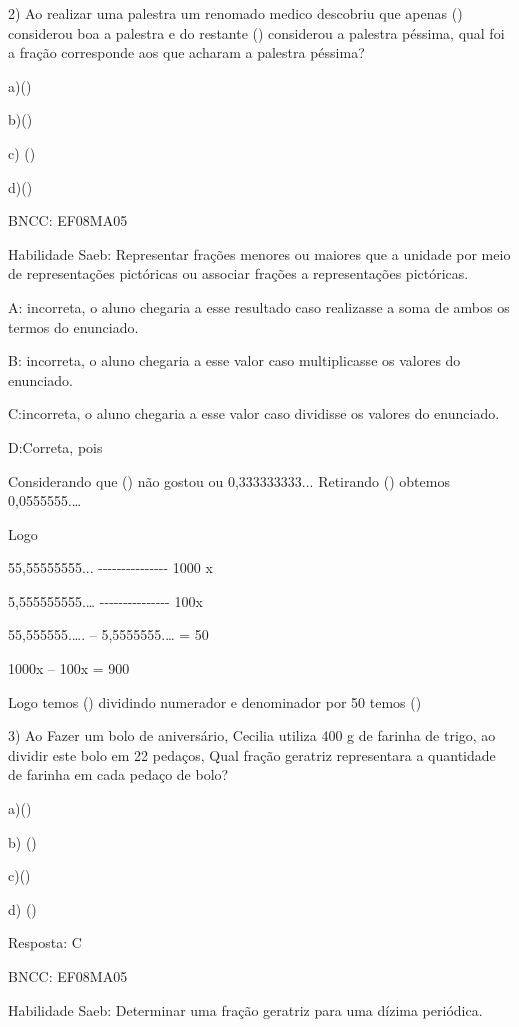 2) Ao realizar uma palestra um renomado medico descobriu que apenas
() considerou boa a palestra e do restante ()
considerou a palestra péssima, qual foi a fração corresponde aos que
acharam a palestra péssima?

a)()

b)()

c) ()

d)()

BNCC: EF08MA05

Habilidade Saeb: Representar frações menores ou maiores que a unidade
por meio de representações pictóricas ou associar frações a
representações pictóricas.

A: incorreta, o aluno chegaria a esse resultado caso realizasse a soma
de ambos os termos do enunciado.

B: incorreta, o aluno chegaria a esse valor caso multiplicasse os
valores do enunciado.

C:incorreta, o aluno chegaria a esse valor caso dividisse os valores do
enunciado.

D:Correta, pois

Considerando que () não gostou ou 0,333333333... Retirando
() obtemos 0,0555555.\ldots{}

Logo

55,55555555... -\/-\/-\/-\/-\/-\/-\/-\/-\/-\/-\/-\/-\/-\/- 1000 x

5,555555555.\ldots{} -\/-\/-\/-\/-\/-\/-\/-\/-\/-\/-\/-\/-\/-\/- 100x

55,555555.\ldots. -- 5,5555555.\ldots{} = 50

1000x -- 100x = 900

Logo temos () dividindo numerador e denominador por 50
temos ()

3) Ao Fazer um bolo de aniversário, Cecilia utiliza 400 g de farinha de
trigo, ao dividir este bolo em 22 pedaços, Qual fração geratriz
representara a quantidade de farinha em cada pedaço de bolo?

a)()

b) ()

c)()

d) ()

Resposta: C

BNCC: EF08MA05

Habilidade Saeb: Determinar uma fração geratriz para uma dízima
periódica.

